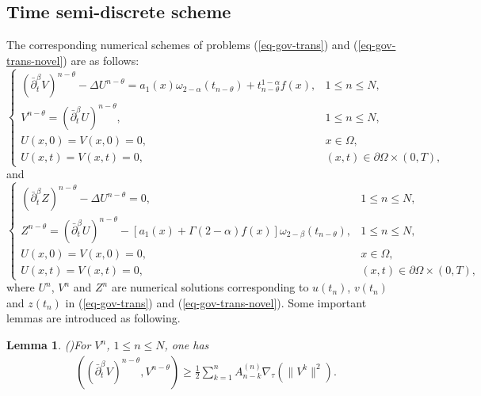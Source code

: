 \documentclass[11pt]{article}
\newtheorem{lemma}{Lemma}[section]
\numberwithin{equation}{section}
\begin{document}
\subsection{Time semi-discrete scheme}
The corresponding numerical schemes of problems (\ref{eq-gov-trans}) and (\ref{eq-gov-trans-novel}) are as follows:
\begin{equation}\label{num-scheme-1}
\begin{cases}
  (\bar\partial_t^\beta V)^{n-\theta} - \Delta U^{n-\theta} = a_1(x)\omega_{2-\alpha}(t_{n-\theta})+t_{n-\theta}^{1-\alpha}f(x), & 1\le n \le N, \\
  V^{n-\theta}  = (\bar\partial_t^\beta U)^{n-\theta}, & 1\le n \le N, \\
  U(x,0) = V(x,0)=0, & x \in \Omega, \\
  U(x,t) = V(x,t)=0, & (x,t) \in \partial \Omega \times (0,T),
\end{cases}
\end{equation}
and
\begin{equation}\label{num-scheme-2} \begin{cases}   (\bar\partial_t^\beta Z)^{n-\theta} - \Delta U^{n-\theta} = 0, & 1\le n \le N, \\  
Z^{n-\theta}  = (\bar\partial_t^\beta U)^{n-\theta}-[a_1(x)+\Gamma{(2-\alpha)}f(x)]\omega_{2-\beta}(t_{n-\theta}), & 1\le n \le N, \\   U(x,0) = V(x,0)=0, & x \in \Omega,\\ U(x,t) = V(x,t)=0, & (x,t) \in \partial \Omega \times (0,T), \end{cases} \end{equation}
where $U^n$, $V^n$  and $Z^n$ are numerical solutions corresponding to $u(t_n)$, $v(t_n)$ and $z(t_n)$  in (\ref{eq-gov-trans}) and (\ref{eq-gov-trans-novel}).
Some important lemmas are introduced as following.
\begin{lemma}\label{FD-ineq}
(\cite{LiaoH2018L1})For $V^n$, $1\leq n\leq N$, one has
\begin{align*}
((\bar\partial_t^\beta V)^{n-\theta},V^{n-\theta})\geq\frac{1}{2}\sum\limits_{k=1}^{n}A_{n-k}^{(n)}\nabla_{\tau}
(\|V^k\|^2).
\end{align*}
\end{lemma}
\end{document}

